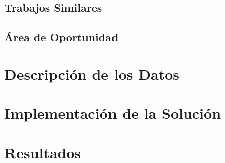 \section{Trabajos Similares}
\section{Área de Oportunidad}

\chapter{Descripción de los Datos}


\chapter{Implementación de la Solución}

\chapter{Resultados}

